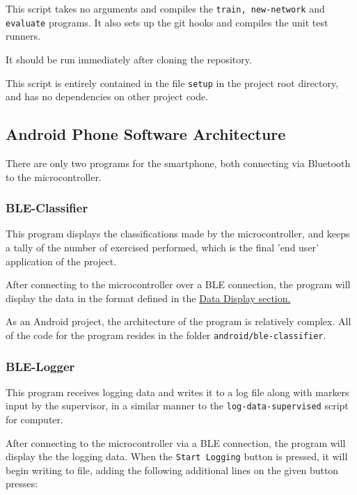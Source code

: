 \documentclass[a4paper]{article}
\begin{document}
This script takes no arguments and compiles the \lstinline{train, new-network} and \lstinline{evaluate} programs. It also sets up the git hooks and compiles the unit test runners.

It should be run immediately after cloning the repository.

This script is entirely contained in the file \lstinline{setup} in the project root directory, and has no dependencies on other project code.

\subsection{Android Phone Software Architecture}%
\label{subsec:dc_asa}

There are only two programs for the smartphone, both connecting via Bluetooth to the microcontroller.

\subsubsection{BLE-Classifier}
\label{subsubsec:dc_asa_classifier}

This program displays the classifications made by the microcontroller, and keeps a tally of the number of exercised performed, which is the final 'end user' application of the project.

After connecting to the microcontroller over a BLE connection, the program will display the data in the format defined in the \hyperref[subsec:dc_datadisplay]{Data Display section.}

As an Android project, the architecture of the program is relatively complex. All of the code for the program resides in the folder \lstinline{android/ble-classifier}. 


\subsubsection{BLE-Logger}
\label{subsubsec:dc_asa_logger}

This program receives logging data and writes it to a log file along with markers input by the supervisor, in a similar manner to the \lstinline{log-data-supervised} script for computer.

After connecting to the microcontroller via a BLE connection, the program will display the the logging data. When the \lstinline{Start Logging} button is pressed, it will begin writing to file, adding the following additional lines on the given button presses:
\end{document}
